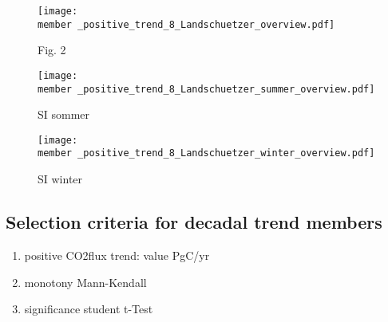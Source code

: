 \documentclass[12pt]{article}
\newcommand{\member}{m182_1988_1995} %
\begin{document}
\clearpage


\begin{figure}
\centering
\texttt{[image: \\member \_positive\_trend\_8\_Landschuetzer\_overview.pdf]}
\caption{\citep{landschuetzer2015} Fig. 2}
\label{fig:landschuetzer}
\end{figure}
\begin{figure}
\centering
\texttt{[image: \\member \_positive\_trend\_8\_Landschuetzer\_summer\_overview.pdf]}
\caption{\citep{landschuetzer2015} SI sommer}
\label{fig:landschuetzer_summer}
\end{figure}
\begin{figure}
\centering
\texttt{[image: \\member \_positive\_trend\_8\_Landschuetzer\_winter\_overview.pdf]}
\caption{\citep{landschuetzer2015} SI winter}
\label{fig:landschuetzer_winter}
\end{figure}

\clearpage

\subsection*{Selection criteria for decadal trend members}
\begin{enumerate}
\item positive CO2flux trend: value PgC/yr
\item monotony Mann-Kendall
\item significance student t-Test
\end{enumerate}
\end{document}
